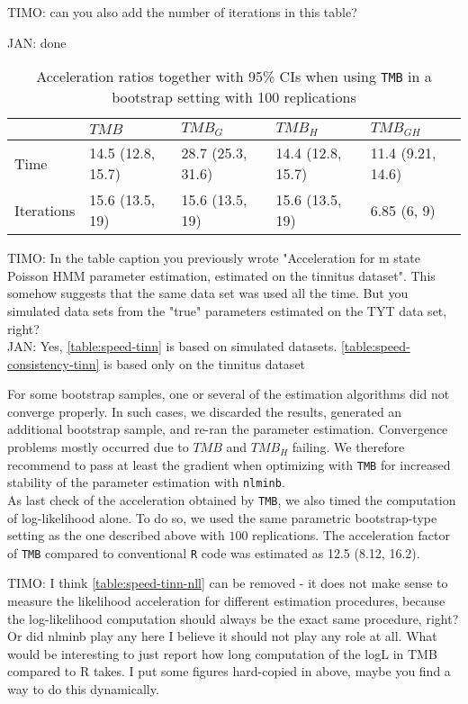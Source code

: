 \documentclass[bimj,fleqn]{w-art}\usepackage[]{graphicx}\usepackage[]{color}
\theoremstyle{plain}
\theoremstyle{definition}
\begin{document}
TIMO: can you also add the number of iterations in this table?

JAN: done

\begin{table}[ht]
\centering
\begin{tabular}{lllll}
  \hline
 & \textit{${TMB}$} & \textit{${TMB_G}$} & \textit{${TMB_H}$} & \textit{${TMB_{GH}}$} \\ 
  \hline
Time & 14.5 (12.8, 15.7) & 28.7 (25.3, 31.6) & 14.4 (12.8, 15.7) & 11.4 (9.21, 14.6) \\ 
  Iterations & 15.6 (13.5, 19) & 15.6 (13.5, 19) & 15.6 (13.5, 19) & 6.85 (6, 9) \\ 
   \hline
\end{tabular}
\caption{Acceleration ratios together with 95\% CIs when using {\tt TMB} in a bootstrap setting with 100 replications} 
\label{table:speed-tinn}
\end{table}


TIMO: In the table caption you previously wrote "Acceleration for m state Poisson HMM parameter estimation, estimated on the tinnitus dataset". This somehow suggests that the same data set was used all the time. But you simulated data sets from the "true" parameters estimated on the TYT data set, right?\\[1ex]

JAN: Yes, \autoref{table:speed-tinn} is based on simulated datasets. \autoref{table:speed-consistency-tinn} is based only on the tinnitus dataset


For some bootstrap samples, one or several of the estimation algorithms did not converge properly. In such cases, we discarded the results, generated an additional bootstrap sample, and re-ran the parameter estimation. Convergence problems mostly occurred due to $TMB$ and $TMB_H$ failing. We therefore recommend to pass at least the gradient when optimizing with {\tt{TMB}} for increased stability of the parameter estimation with {\tt nlminb}.\\
As last check of the acceleration obtained by {\tt{TMB}}, we also timed the computation of log-likelihood alone. To do so, we used the same parametric bootstrap-type setting as the one described above with $100$ replications. The acceleration factor of {\tt{TMB}} compared to conventional {\tt R} code was estimated as 12.5 (8.12, 16.2).



TIMO: I think \autoref{table:speed-tinn-nll} can be removed - it does not make sense to measure the likelihood acceleration for different estimation procedures, because the log-likelihood computation should always be the exact same procedure, right? Or did nlminb play any here I believe it should not play any role at all. What would be interesting to just report how long computation of the logL in TMB compared to R takes. I put some figures hard-copied in above, maybe you find a way to do this dynamically.
\end{document}
